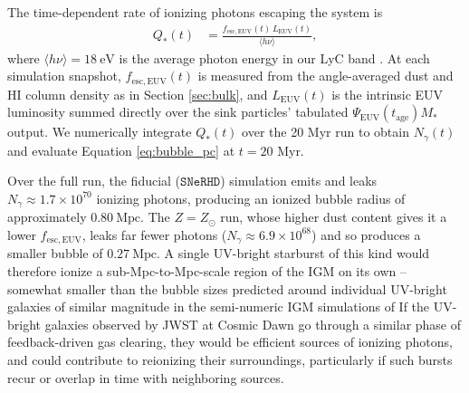 \documentclass[twocolumn,linenumbers]{aastex631}
\begin{document}
The time-dependent rate of ionizing photons escaping the system is
\begin{align}
Q_*(t) &= \frac{f_\mathrm{esc,EUV}(t)\,L_\mathrm{EUV}(t)}{\langle h\nu \rangle},
\end{align}
where $\langle h\nu \rangle = 18\ \mathrm{eV}$ is the average photon energy in our LyC band \citep{2025ApJ...987...12M}. At each simulation snapshot, $f_\mathrm{esc,EUV}(t)$ is measured from the angle-averaged dust and HI column density as in Section \ref{sec:bulk}, and $L_\mathrm{EUV}(t)$ is the intrinsic EUV luminosity summed directly over the sink particles' tabulated $\Psi_\mathrm{EUV}(t_\mathrm{age})M_*$ output. We numerically integrate $Q_*(t)$ over the 20 Myr run to obtain $N_\gamma(t)$ and evaluate Equation \ref{eq:bubble_pc} at $t=20$ Myr.

Over the full run, the fiducial ($\mathtt{SNeRHD}$) simulation emits and leaks $N_\gamma \approx 1.7\times10^{70}$ ionizing photons, producing an ionized bubble radius of approximately $0.80\ \mathrm{Mpc}$. The $Z=Z_\odot$ run, whose higher dust content gives it a lower $f_\mathrm{esc,EUV}$, leaks far fewer photons ($N_\gamma \approx 6.9\times10^{68}$) and so produces a smaller bubble of $0.27\ \mathrm{Mpc}$. 
A single UV-bright starburst of this kind would therefore ionize a sub-Mpc-to-Mpc-scale region of the IGM on its own -- somewhat smaller than the bubble sizes predicted around individual UV-bright galaxies of similar magnitude in the semi-numeric IGM simulations of \citet{2024MNRAS.528.4872L}
If the UV-bright galaxies observed by JWST at Cosmic Dawn go through a similar phase of feedback-driven gas clearing, they would be efficient sources of ionizing photons, and could contribute to reionizing their surroundings, particularly if such bursts recur or overlap in time with neighboring sources.
\end{document}

